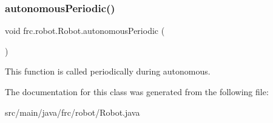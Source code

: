 \subsubsection{\texorpdfstring{autonomous\+Periodic()}{autonomousPeriodic()}}
{\footnotesize\ttfamily void frc.\+robot.\+Robot.\+autonomous\+Periodic (\begin{DoxyParamCaption}{ }\end{DoxyParamCaption})}

This function is called periodically during autonomous. 

The documentation for this class was generated from the following file\+:\begin{DoxyCompactItemize}
\item 
src/main/java/frc/robot/Robot.\+java\end{DoxyCompactItemize}

